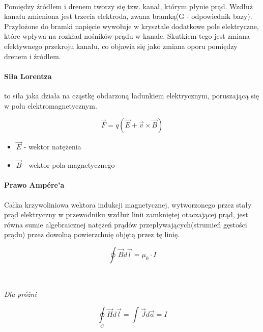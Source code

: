 \documentclass{article}
\begin{document}
            \
            
            Pomiędzy źródłem i drenem tworzy się tzw. kanał, którym płynie prąd.
            Wzdłuż kanału zmieniona jest trzecia elektroda, zwana bramką(G - odpowiednik bazy).
            Przyłożone do bramki napięcie wywołuje w krysztale dodatkowe pole elektryczne,
            które wpływa na rozkład nośników prądu w kanale. Skutkiem tego jest zmiana
            efektywnego przekroju kanału, co objawia się jako zmiana oporu pomiędzy drenem i źródłem.


            \paragraph{Siła Lorentza} to siła jaka działa na cząstkę obdarzoną ładunkiem
            elektrycznym, poruszającą się w polu elektromagnetycznym.
            
            \begin{equation}
                \vec{F} = q(\vec{E} + \vec{v} \times \vec{B})     
            \end{equation}

            \begin{itemize}
                \item $\vec{E}$ - wektor natężenia
                \item $\vec{B}$ - wektor pola magnetycznego
            \end{itemize}

            \paragraph{Prawo Amp\'ere'a}
            Całka krzywoliniowa wektora indukcji magnetycznej, wytworzonego przez stały
            prąd elektryczny w przewodniku wzdłuż linii zamkniętej otaczającej prąd, jest 
            równa sumie algebraicznej natężeń prądów przepływających(strumień gęstości
            prądu) przez dowolną powierzchnię objętą przez tę linię.

            \begin{equation}
                \oint\nolimits_{} \vec{B} d\vec{l} = \mu_0\cdotp I
            \end{equation}
            
            \
            
            \textit{Dla próżni}

            \begin{equation}
                \oint\limits_{C} \vec{H} d\vec{l} = \int\nolimits_{} \vec{J}d\vec{a} = I
            \end{equation}
                        
\end{document}
